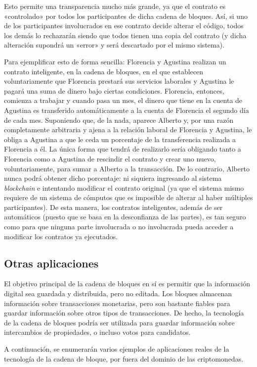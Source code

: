 \documentclass[12pt,a4paper,twoside]{book}
\begin{document}
Esto permite una transparencia mucho más grande, ya que el contrato es «controlado» por todos los participantes de dicha cadena de bloques. Así, si uno de los participantes involucrados en ese contrato decide alterar el código, todos los demás lo rechazarán siendo que todos tienen una copia del contrato (y dicha alteración supondrá un «error» y será descartado por el mismo sistema).

Para ejemplificar esto de forma sencilla: Florencia y Agustina realizan un contrato inteligente, en la cadena de bloques, en el que establecen voluntariamente que Florencia prestará sus servicios laborales y Agustina le pagará una suma de dinero bajo ciertas condiciones. Florencia, entonces, comienza a trabajar y cuando pasa un mes, el dinero que tiene en la cuenta de Agustina es transferido automáticamente a la cuenta de Florencia el segundo día de cada mes. Suponiendo que, de la nada, aparece Alberto y, por una razón completamente arbitraria y ajena a la relación laboral de Florencia y Agustina, le obliga a Agustina a que le ceda un porcentaje de la transferencia realizada a Florencia a él. La única forma que tendrá de realizarlo sería obligando tanto a Florencia como a Agustina de rescindir el contrato y crear uno nuevo, voluntariamente, para sumar a Alberto a la transacción. De lo contrario, Alberto nunca podrá obtener dicho porcentaje: ni siquiera ingresando al sistema \textit{blockchain} e intentando modificar el contrato original (ya que el sistema mismo requiere de un sistema de cómputos que es imposible de alterar al haber múltiples participantes). De esta manera, los contratos inteligentes, además de ser automáticos (puesto que se basa en la desconfianza de las partes), es tan seguro como para que ninguna parte involucrada o no involucrada pueda acceder a modificar los contratos ya ejecutados.

\subsection{Otras aplicaciones}
El objetivo principal de la cadena de bloques en sí es permitir que la información digital sea guardada y distribuida, pero no editada. Los bloques almacenan información sobre transacciones monetarias, pero son bastante fiables para guardar información sobre otros tipos de transacciones. De hecho, la tecnología de la cadena de bloques podría ser utilizada para guardar información sobre intercambios de propiedades, o incluso votos para candidatos.

A continuación, se enumerarán varios ejemplos de aplicaciones reales de la tecnología de la cadena de bloque, por fuera del dominio de las criptomonedas.
\end{document}
